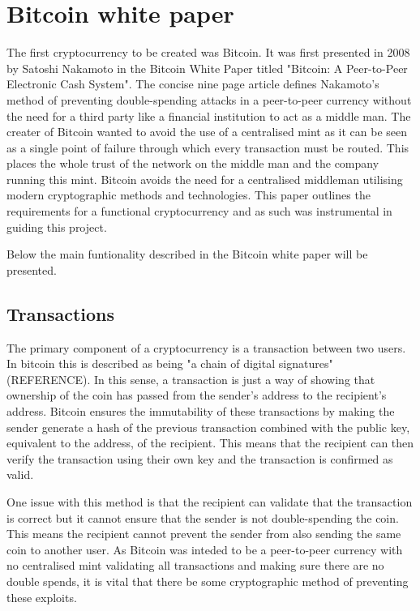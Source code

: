 \documentclass{l4proj}
\begin{document}
\section{Bitcoin white paper}
The first cryptocurrency to be created was Bitcoin. It was first presented in 2008 by Satoshi Nakamoto in the Bitcoin White Paper
titled "Bitcoin: A Peer-to-Peer Electronic Cash System". The concise nine page article defines Nakamoto's method of preventing
double-spending attacks in a peer-to-peer currency without the need for a third party like a financial institution to 
act as a middle man. The creater of Bitcoin wanted to avoid the use of a centralised mint as it can be seen as a single 
point of failure through which every transaction must be routed. This places the whole trust of the network on the middle 
man and the company running this mint.  Bitcoin avoids the need for a centralised middleman utilising modern cryptographic 
methods and technologies. This paper outlines the requirements for a functional cryptocurrency and as such was instrumental 
in guiding this project.

Below the main funtionality described in the Bitcoin white paper will be presented.


\subsection{Transactions}
The primary component of a cryptocurrency is a transaction between two users. In bitcoin this is described as being "a
chain of digital signatures" (REFERENCE). In this sense, a transaction is just a way of showing that ownership of the coin has
passed from the sender's address to the recipient's address. Bitcoin ensures the immutability of these transactions
by making the sender generate a hash of the previous transaction combined with the public key, equivalent to the address,
of the recipient. This means that the recipient can then verify the transaction using their own key and the transaction
is confirmed as valid.

One issue with this method is that the recipient can validate that the transaction is correct but it cannot ensure
that the sender is not double-spending the coin. This means the recipient cannot prevent the sender from also sending the 
same coin to another user. As Bitcoin was inteded to be a peer-to-peer currency with no centralised mint validating
all transactions and making sure there are no double spends, it is vital that there be some cryptographic method of
preventing these exploits.
\end{document}
